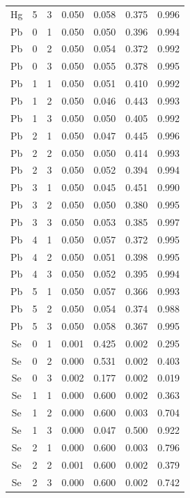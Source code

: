 \documentclass[ms, hidelinks]{uncgdissertationexp3}
\theoremstyle{plain}
\theoremstyle{definition}
\theoremstyle{remark}
\begin{document}
\begin{longtable}{ccccccc}
  Hg & 5 & 3 & 0.050 & 0.058 & 0.375 & 0.996\\
  \rowcolor{gray!6}  Pb & 0 & 1 & 0.050 & 0.050 & 0.396 & 0.994\\
  Pb & 0 & 2 & 0.050 & 0.054 & 0.372 & 0.992\\
  \rowcolor{gray!6}  Pb & 0 & 3 & 0.050 & 0.055 & 0.378 & 0.995\\
  Pb & 1 & 1 & 0.050 & 0.051 & 0.410 & 0.992\\
  \rowcolor{gray!6}  Pb & 1 & 2 & 0.050 & 0.046 & 0.443 & 0.993\\
  Pb & 1 & 3 & 0.050 & 0.050 & 0.405 & 0.992\\
  \rowcolor{gray!6}  Pb & 2 & 1 & 0.050 & 0.047 & 0.445 & 0.996\\
  Pb & 2 & 2 & 0.050 & 0.050 & 0.414 & 0.993\\
  \rowcolor{gray!6}  Pb & 2 & 3 & 0.050 & 0.052 & 0.394 & 0.994\\
  Pb & 3 & 1 & 0.050 & 0.045 & 0.451 & 0.990\\
  \rowcolor{gray!6}  Pb & 3 & 2 & 0.050 & 0.050 & 0.380 & 0.995\\
  Pb & 3 & 3 & 0.050 & 0.053 & 0.385 & 0.997\\
  \rowcolor{gray!6}  Pb & 4 & 1 & 0.050 & 0.057 & 0.372 & 0.995\\
  Pb & 4 & 2 & 0.050 & 0.051 & 0.398 & 0.995\\
  \rowcolor{gray!6}  Pb & 4 & 3 & 0.050 & 0.052 & 0.395 & 0.994\\
  Pb & 5 & 1 & 0.050 & 0.057 & 0.366 & 0.993\\
  \rowcolor{gray!6}  Pb & 5 & 2 & 0.050 & 0.054 & 0.374 & 0.988\\
  Pb & 5 & 3 & 0.050 & 0.058 & 0.367 & 0.995\\
  \rowcolor{gray!6}  Se & 0 & 1 & 0.001 & 0.425 & 0.002 & 0.295\\
  Se & 0 & 2 & 0.000 & 0.531 & 0.002 & 0.403\\
  \rowcolor{gray!6}  Se & 0 & 3 & 0.002 & 0.177 & 0.002 & 0.019\\
  Se & 1 & 1 & 0.000 & 0.600 & 0.002 & 0.363\\
  \rowcolor{gray!6}  Se & 1 & 2 & 0.000 & 0.600 & 0.003 & 0.704\\
  Se & 1 & 3 & 0.000 & 0.047 & 0.500 & 0.922\\
  \rowcolor{gray!6}  Se & 2 & 1 & 0.000 & 0.600 & 0.003 & 0.796\\
  Se & 2 & 2 & 0.001 & 0.600 & 0.002 & 0.379\\
  \rowcolor{gray!6}  Se & 2 & 3 & 0.000 & 0.600 & 0.002 & 0.742\\

\end{longtable}
\end{document}
